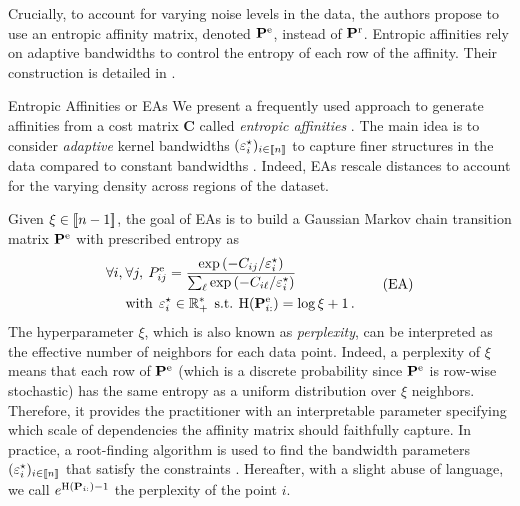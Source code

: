 Crucially, to account for varying noise levels in the data, the authors propose to use an entropic affinity matrix, denoted ${\mathbf{P}}^{\mathrm{e}}$, instead of ${\mathbf{P}}^{\mathrm{r}}$. Entropic affinities rely on adaptive bandwidths to control the entropy of each row of the affinity. Their construction is detailed in .

\begin{mem1}{Entropic Affinities or EAs}\label{mem:entropic_affinities}
We present a frequently used approach to generate affinities from a cost matrix $\mathbf{C}$ called \emph{entropic affinities}  \citep{hinton2002stochastic}. The main idea is to consider \emph{adaptive} kernel bandwidths $(\varepsilon^\star_i)_{i \in {[\![n]\!]}}$ to capture finer structures in the data compared to constant bandwidths \citep{van2018recovering}. Indeed, EAs rescale distances to account for the varying density across regions of the dataset.

Given $\xi \in {[\![n-1]\!]}$, the goal of EAs is to build a Gaussian Markov chain transition matrix ${\mathbf{P}}^{\mathrm{e}}$ with prescribed entropy as
\begin{equation}
\begin{split}
    \forall i, \: &\forall j, \: P^{\mathrm{e}}_{ij} = \frac{\exp{(-C_{ij}/\varepsilon^\star_i)}}{\sum_\ell \exp{(-C_{i\ell}/\varepsilon^\star_i)}} \\
    &\text{with} \:\: \varepsilon^\star_i \in \mathbb{R}^*_+ \:\: \text{s.t.} \: \operatorname{H}({\mathbf{P}}^{\mathrm{e}}_{i:}) = \log{\xi} + 1\,. \label{eq:entropic_affinity_pb}
\end{split}\tag{EA}
\end{equation}
The hyperparameter $\xi$, which is also known as \emph{perplexity}, can be interpreted as the effective number of neighbors for each data point. Indeed, a perplexity of $\xi$ means that each row of ${\mathbf{P}}^{\mathrm{e}}$ (which is a discrete probability since ${\mathbf{P}}^{\mathrm{e}}$ is row-wise stochastic) has the same entropy as a uniform distribution over $\xi$ neighbors. Therefore, it provides the practitioner with an interpretable parameter specifying which scale of dependencies the affinity matrix should faithfully capture. In practice, a root-finding algorithm is used to find the bandwidth parameters $(\varepsilon_i^\star)_{i \in {[\![n]\!]}}$ that satisfy the constraints \citep{vladymyrov2013entropic}. Hereafter, with a slight abuse of language, we call $e^{\operatorname{H}({\mathbf{P}}_{i:})-1}$ the perplexity of the point $i$.
\end{mem1}

